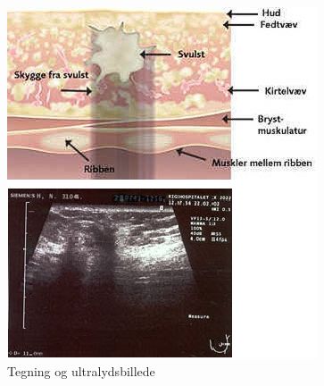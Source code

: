 \begin{figure}[H]
\begin{minipage}{0.535\textwidth}
    \includegraphics[width=\textwidth]{figurer/r/samlet}
    \caption{Tegning og ultralydsbillede \cite{Ultralyd}}
    \label{ultralyd}
  \end{minipage}
\end{figure}

